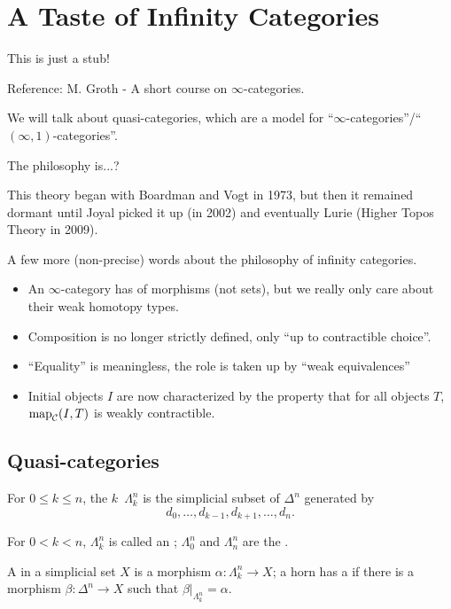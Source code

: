 
\chapter{A Taste of Infinity Categories}


\warning This is just a stub!

Reference: M. Groth - A short course on $\infty$-categories.

We will talk about quasi-categories, which are a model for \enquote{$\infty$-categories}/\enquote{$(\infty,1)$-categories}.

The philosophy is...?

This theory began with Boardman and Vogt in 1973, but then it remained dormant until Joyal picked it up (in 2002) and eventually Lurie (Higher Topos Theory in 2009).

A few more (non-precise) words about the philosophy of infinity categories.
\begin{itemize}
    \item An $\infty$-category has  of morphisms (not sets), but we really only care about their weak homotopy types.
    
    \item Composition is no longer strictly defined, only \enquote{up to contractible choice}.
    
    \item \enquote{Equality} is meaningless, the role is taken up by \enquote{weak equivalences}
    
    \item Initial objects $I$ are now characterized by the property that for all objects $T$, $\operatorname{map}_{\mathcal{C}}(I,T)$ is weakly contractible.
\end{itemize}

\section{Quasi-categories}

For $0\le k\le n$, the $k$\alvaropls\ $\Lambda^n_k$ is the simplicial subset of $\Delta^n$ generated by \[d_0,\dots,d_{k-1},d_{k+1},\dots,d_n.\]

For $0<k<n$, $\Lambda^n_k$ is called an ; $\Lambda^n_0$ and $\Lambda^n_n$ are the .

A  in a simplicial set $X$ is a morphism $\alpha:\Lambda^n_k\to X$; a horn has a  if there is a morphism $\beta:\Delta^n\to X$ such that $\beta|_{\Lambda^n_k}=\alpha$.

